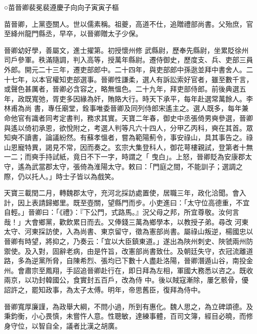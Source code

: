 
\begin{pinyinscope}

 ○苗晉卿裴冕裴遵慶子向向子寅寅子樞



 苗晉卿，上黨壺關人。世以儒素稱。祖夔，高道不仕，追贈禮部尚書。父殆庶，官至絳州龍門縣丞，早卒，以晉卿贈太子少保。



 晉卿幼好學，善屬文，進士擢第。初授懷州修
 武縣尉，歷奉先縣尉，坐累貶徐州司戶參軍。秩滿隨調，判入高等，授萬年縣尉。遷侍御史，歷度支、兵、吏部三員外郎。開元二十三年，遷吏部郎中。二十四年，與吏部郎中孫逖並拜中書舍人。二十七年，以本官權知吏部選事。晉卿性謙柔，選人有訴訟索好官者，雖至數千言，或聲色甚厲者，晉卿必含容之，略無慍色。二十九年，拜吏部侍郎。前後典選五年，政既寬弛，胥吏多因緣為奸，賄賂大行。時天下承平，每年赴選常萬餘人。李林甫為尚
 書，專任廟堂，銓事唯委晉卿及同列侍郎宋遙主之。選人既多，每年兼命他官有識者同考定書判，務求其實。天寶二年春，御史中丞張倚男奭參選，晉卿與遙以倚初承恩，欲悅附之，考選人判等凡六十四人，分甲乙丙科，奭在其首。眾知奭不讀書，論議紛然。有蘇孝慍者，嘗為範陽薊令，事安祿山，具其事告之。祿山恩寵特異，謁見不常，因而奏之。玄宗大集登科人，御花萼樓親試，登第者十無一二；而奭手持試紙，竟日不下一字，時謂之「
 曳白」。上怒，晉卿貶為安康郡太守，遙為武當郡太守，張倚為淮陽太守。敕曰：「門庭之間，不能訓子；選調之際，仍以托人。」時士子皆以為戲笑。



 天寶三載閏二月，轉魏郡太守，充河北採訪處置使，居職三年，政化洽聞。會入計，因上表請歸鄉里。既至壺關，望縣門而步。小吏進曰：「太守位高德重，不宜自輕。」晉卿曰：「《禮》：『下公門，式路馬。』況父母之邦，所宜尊敬。汝何言哉！」大會鄉黨，歡飲累日而去。又俸錢三萬為鄉學本，以教授子弟。尋改
 河東太守、河東採訪使，入為尚書、東京留守，徵為憲部尚書。屬祿山叛逆，楊國忠以晉卿有時望，將抑之，乃奏云：「宜以大臣鎮東道。」遂出為陜州刺史、陜虢兩州防禦使。及入對，固辭老病，由是忤旨，改憲部尚書致仕。及朝廷失守，衣冠流離道路，多為逆黨所脅，自陳希烈、張均已下數十人盡赴洛陽，晉卿潛遁山谷，南投金州。會肅宗至鳳翔，手詔追晉卿赴行在，即日拜為左相，軍國大務悉以咨之。既收兩京，以功封韓國公，食實封五百戶，改為侍
 中。後以賊寇漸除，屢乞骸骨，優詔許之，罷知政事，為太子太傅。明年，帝思舊臣，復拜為侍中。



 晉卿寬厚廉謹，為政舉大綱，不問小過，所到有惠化。魏人思之，為立碑頌德。及秉鈞衡，小心畏慎，未嘗忤人意。性聰敏，達練事體，百司文簿，經目必曉，而修身守位，以智自全，議者比漢之胡廣。




\end{pinyinscope}
